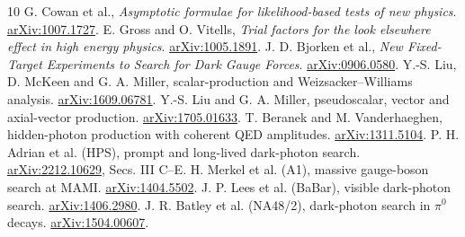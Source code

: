 \documentclass[11pt,letterpaper]{article}
\begin{document}
\begingroup\footnotesize
\begin{thebibliography}{10}
 G. Cowan et al., \emph{Asymptotic formulae for likelihood-based tests of new physics}. \href{https://arxiv.org/abs/1007.1727}{arXiv:1007.1727}.
 E. Gross and O. Vitells, \emph{Trial factors for the look elsewhere effect in high energy physics}. \href{https://arxiv.org/abs/1005.1891}{arXiv:1005.1891}.
 J. D. Bjorken et al., \emph{New Fixed-Target Experiments to Search for Dark Gauge Forces}. \href{https://arxiv.org/abs/0906.0580}{arXiv:0906.0580}.
 Y.-S. Liu, D. McKeen and G. A. Miller, scalar-production and Weizsacker--Williams analysis. \href{https://arxiv.org/abs/1609.06781}{arXiv:1609.06781}.
 Y.-S. Liu and G. A. Miller, pseudoscalar, vector and axial-vector production. \href{https://arxiv.org/abs/1705.01633}{arXiv:1705.01633}.
 T. Beranek and M. Vanderhaeghen, hidden-photon production with coherent QED amplitudes. \href{https://arxiv.org/abs/1311.5104}{arXiv:1311.5104}.
 P. H. Adrian et al. (HPS), prompt and long-lived dark-photon search. \href{https://arxiv.org/abs/2212.10629}{arXiv:2212.10629}, Secs. III C--E.
 H. Merkel et al. (A1), massive gauge-boson search at MAMI. \href{https://arxiv.org/abs/1404.5502}{arXiv:1404.5502}.
 J. P. Lees et al. (BaBar), visible dark-photon search. \href{https://arxiv.org/abs/1406.2980}{arXiv:1406.2980}.
 J. R. Batley et al. (NA48/2), dark-photon search in $\pi^0$ decays. \href{https://arxiv.org/abs/1504.00607}{arXiv:1504.00607}.
\end{thebibliography}\endgroup
\end{document}
